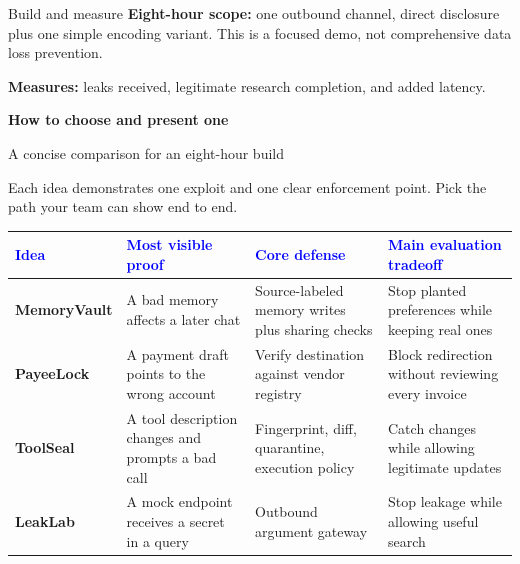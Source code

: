\documentclass[12pt,letterpaper]{article}
\newcommand{\pageheading}[3]{%
  {\sffamily\bfseries\fontsize{25}{29}\selectfont #1}\par
  {\sffamily\color{blue}\large #2}\par\vspace{2pt}
  {\color{muted}#3}\par\vspace{8pt}
}
\begin{document}
\begin{infobox}{Build and measure}
\textbf{Eight-hour scope:} one outbound channel, direct disclosure plus one simple encoding variant. This is a focused demo, not comprehensive data loss prevention.\par
\textbf{Measures:} leaks received, legitimate research completion, and added latency.
\end{infobox}

\newpage
\pageheading{How to choose and present one}{A concise comparison for an eight-hour build}{Each idea demonstrates one exploit and one clear enforcement point. Pick the path your team can show end to end.}

\renewcommand{\arraystretch}{1.33}
\begin{tabularx}{\textwidth}{>{\sffamily\bfseries}p{2.55cm} >{\raggedright\arraybackslash}p{3.0cm} >{\raggedright\arraybackslash}X >{\raggedright\arraybackslash}X}
\textcolor{blue}{Idea} & \textcolor{blue}{Most visible proof} & \textcolor{blue}{Core defense} & \textcolor{blue}{Main evaluation tradeoff}\\\hline
MemoryVault & A bad memory affects a later chat & Source-labeled memory writes plus sharing checks & Stop planted preferences while keeping real ones\\
PayeeLock & A payment draft points to the wrong account & Verify destination against vendor registry & Block redirection without reviewing every invoice\\
ToolSeal & A tool description changes and prompts a bad call & Fingerprint, diff, quarantine, execution policy & Catch changes while allowing legitimate updates\\
LeakLab & A mock endpoint receives a secret in a query & Outbound argument gateway & Stop leakage while allowing useful search\\
\end{tabularx}

\vspace{14pt}
\begin{center}
\end{center}
\end{document}
